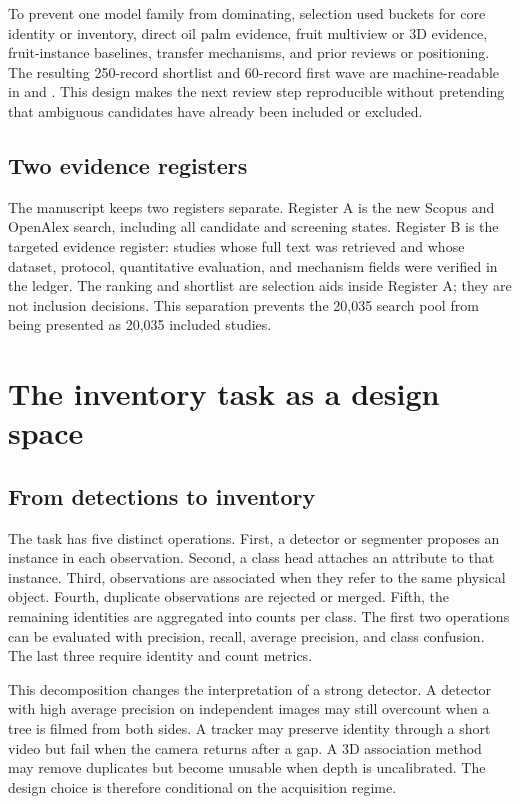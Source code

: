 To prevent one model family from dominating, selection used buckets for core identity or inventory, direct oil palm evidence, fruit multiview or 3D evidence, fruit-instance baselines, transfer mechanisms, and prior reviews or positioning. The resulting 250-record shortlist and 60-record first wave are machine-readable in  and . This design makes the next review step reproducible without pretending that ambiguous candidates have already been included or excluded.

\subsection{Two evidence registers}

The manuscript keeps two registers separate. Register A is the new Scopus and OpenAlex search, including all candidate and screening states. Register B is the targeted evidence register: studies whose full text was retrieved and whose dataset, protocol, quantitative evaluation, and mechanism fields were verified in the ledger. The ranking and shortlist are selection aids inside Register A; they are not inclusion decisions. This separation prevents the 20,035 search pool from being presented as 20,035 included studies.

\section{The inventory task as a design space}
\label{sec:designspace2}

\subsection{From detections to inventory}

The task has five distinct operations. First, a detector or segmenter proposes an instance in each observation. Second, a class head attaches an attribute to that instance. Third, observations are associated when they refer to the same physical object. Fourth, duplicate observations are rejected or merged. Fifth, the remaining identities are aggregated into counts per class. The first two operations can be evaluated with precision, recall, average precision, and class confusion. The last three require identity and count metrics.

This decomposition changes the interpretation of a strong detector. A detector with high average precision on independent images may still overcount when a tree is filmed from both sides. A tracker may preserve identity through a short video but fail when the camera returns after a gap. A 3D association method may remove duplicates but become unusable when depth is uncalibrated. The design choice is therefore conditional on the acquisition regime.


